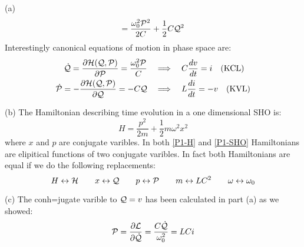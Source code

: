 \begin{homeworkProblem}
\begin{homeworkSection}{(a)}
\begin{equation}
=\frac{\omega_0^2\mathcal{P}^2}{2C}+\frac{1}{2}C\mathcal{Q}^2
\end{equation}
Interestingly canonical equations of motion in phase space are:
\begin{align}
\dot{\mathcal{Q}}=\dfrac{\partial \mathcal{H}(\mathcal{Q},\mathcal{P})}{\partial \mathcal{P}}=\frac{\omega_0^2\mathcal{P}}{C}\quad  &\Longrightarrow \quad   C\frac{dv}{dt}=i \quad\text{(KCL)}\\
\dot{\mathcal{P}}=-\dfrac{\partial \mathcal{H}(\mathcal{Q},\mathcal{P})}{\partial \mathcal{Q}}=-C\mathcal{Q}\quad &\Longrightarrow \quad  L\frac{di}{dt}=-v \quad \text{(KVL)}
\end{align}
\end{homeworkSection}
\begin{homeworkSection}{(b)}
The Hamiltonian describing time evolution in a one dimensional SHO is:
\begin{equation}\label{P1-SHO}
H=\frac{p^2}{2m}+\frac{1}{2}m\omega^2x^2
\end{equation}
where $x$ and $p$ are conjugate varibles. In both \eqref{P1-H} and \eqref{P1-SHO} Hamiltonians are elipitical functions of two conjugate varibles. In fact both Hamiltonians are equal if we do the following replacements:
\begin{equation}\label{P1-Sub}
H\leftrightarrow \mathcal{H}\qquad x\leftrightarrow\mathcal{Q}\qquad p\leftrightarrow\mathcal{P}\qquad m\leftrightarrow LC^2\qquad\omega\leftrightarrow \omega_0
\end{equation}

 \end{homeworkSection}

\begin{homeworkSection}{(c)}
 The conh=jugate varible to $\mathcal{Q}=v$ has been calculated in part (a) as we showed:
 \begin{equation}
 \mathcal{P}=\dfrac{\partial \mathcal{L}}{\partial \dot{\mathcal{Q}}}=\frac{C\dot{\mathcal{Q}}}{\omega_0^2}=LC i
 \end{equation}
 \end{homeworkSection}


\end{homeworkProblem}
